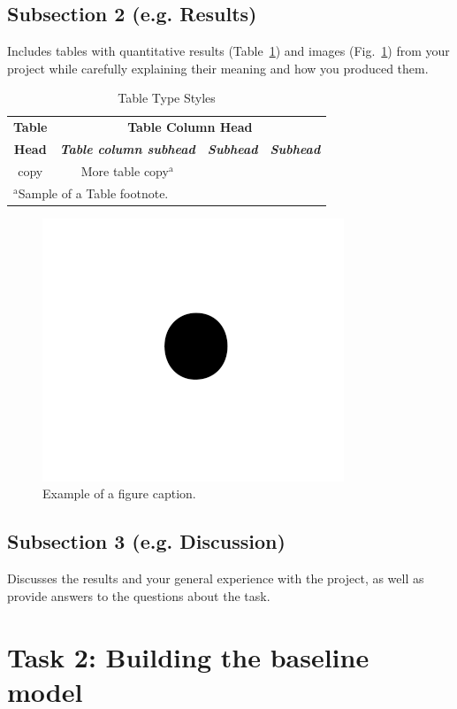 \documentclass[conference]{IEEEtran}
\begin{document}
\subsection{Subsection 2 (e.g. Results)}
Includes tables with quantitative results (Table~\ref{table:example}) and images (Fig.~\ref{fig:example}) from your project while carefully explaining their meaning and how you produced them.
\begin{table}[htbp]
\caption{Table Type Styles}
\begin{center}
\begin{tabular}{|c|c|c|c|}
\hline
\textbf{Table}&\multicolumn{3}{|c|}{\textbf{Table Column Head}} \\
\cline{2-4} 
\textbf{Head} & \textbf{\textit{Table column subhead}}& \textbf{\textit{Subhead}}& \textbf{\textit{Subhead}} \\
\hline
copy& More table copy$^{\mathrm{a}}$& &  \\
\hline
\multicolumn{4}{l}{$^{\mathrm{a}}$Sample of a Table footnote.}
\end{tabular}
\label{table:example}
\end{center}
\end{table}

\begin{figure}[htbp]
\centerline{\includegraphics{fig1.png}}
\caption{Example of a figure caption.}
\label{fig:example}
\end{figure}
\subsection{Subsection 3 (e.g. Discussion)}
Discusses the results and your general experience with the project, as well as provide answers to the questions about the task.
\section{Task 2: Building the baseline model}
\end{document}
